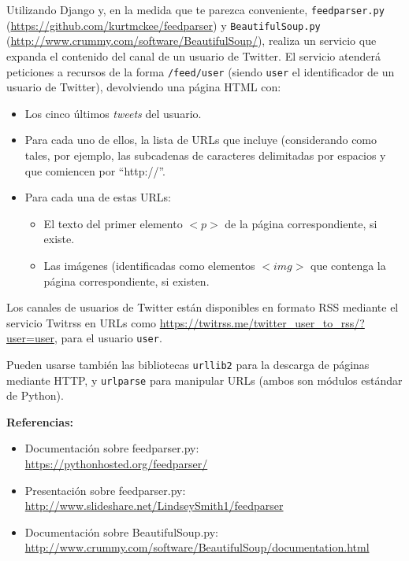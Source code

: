 Utilizando Django y, en la medida que te parezca conveniente, \texttt{feedparser.py} (\url{https://github.com/kurtmckee/feedparser}) y \texttt{BeautifulSoup.py} (\url{http://www.crummy.com/software/BeautifulSoup/}), realiza un servicio que expanda el contenido del canal de un usuario de Twitter. El servicio atenderá peticiones a recursos de la forma \verb|/feed/user| (siendo  \texttt{user} el identificador de un usuario de Twitter), devolviendo una página HTML con:

\begin{itemize}
\item Los cinco últimos \emph{tweets} del usuario.
\item Para cada uno de ellos, la lista de URLs que incluye (considerando como tales, por ejemplo, las subcadenas de caracteres delimitadas por espacios y que comiencen por ``http://''.
\item Para cada una de estas URLs:
  \begin{itemize}
  \item El texto del primer elemento $<p>$ de la página correspondiente, si existe.
  \item Las imágenes (identificadas como elementos $<img>$ que contenga la página correspondiente, si existen.
  \end{itemize}
\end{itemize}

Los canales de usuarios de Twitter están disponibles en formato RSS mediante el servicio Twitrss en URLs como \url{https://twitrss.me/twitter_user_to_rss/?user=user}, para el usuario \texttt{user}.

Pueden usarse también las bibliotecas \texttt{urllib2} para la descarga de páginas mediante HTTP, y \texttt{urlparse} para manipular URLs (ambos son módulos estándar de Python).

\textbf{Referencias:}

\begin{itemize}
\item Documentación sobre feedparser.py: \\
  \url{https://pythonhosted.org/feedparser/}
\item Presentación sobre feedparser.py: \\
  \url{http://www.slideshare.net/LindseySmith1/feedparser}
\item Documentación sobre BeautifulSoup.py: \\
  \url{http://www.crummy.com/software/BeautifulSoup/documentation.html}
\end{itemize}



